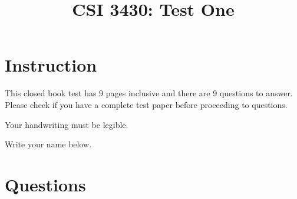 \documentclass{article}
\begin{document}
\title{CSI 3430: Test One}

\date{}

\maketitle

\section*{Instruction}

This closed book test has 9 pages inclusive and there are 9 questions to answer. Please check if you
have a complete test paper before proceeding to questions.
\vspace{2pc}

 \noindent
Your handwriting must be legible. \vspace{2pc}

\noindent Write your name below. \vspace{2pc}



\pagebreak

\section*{Questions}
\end{document}
